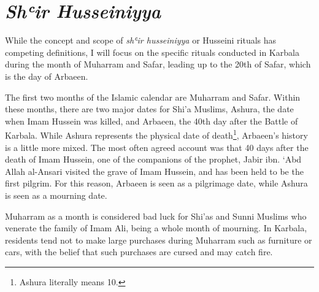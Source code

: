 
\section{\emph{Shʿir Husseiniyya}}
While the concept and scope of \emph{shʿir husseiniyya} or Husseini rituals has competing definitions, I will focus on the specific rituals conducted in Karbala during the month of Muharram and Safar, leading up to the 20th of Safar, which is the day of Arbaeen. 

The first two months of the Islamic calendar are Muharram and Safar. Within these months, there are two major dates for Shi’a Muslims, Ashura, the date when Imam Hussein was killed, and Arbaeen, the 40th day after the Battle of Karbala. While Ashura represents the physical date of death\footnote{Ashura literally means 10.}, Arbaeen’s history is a little more mixed. The most often agreed account was that 40 days after the death of Imam Hussein, one of the companions of the prophet, Jabir ibn. ‘Abd Allah al-Ansari visited the grave of Imam Hussein, and has been held to be the first pilgrim. For this reason, Arbaeen is seen as a pilgrimage date, while Ashura is seen as a mourning date. 


Muharram as a month is considered bad luck for Shi'as and Sunni Muslims who venerate the family of Imam Ali, being a whole month of mourning. In Karbala, residents tend not to make large purchases during Muharram such as furniture or cars, with the belief that such purchases are cursed and may catch fire. 

